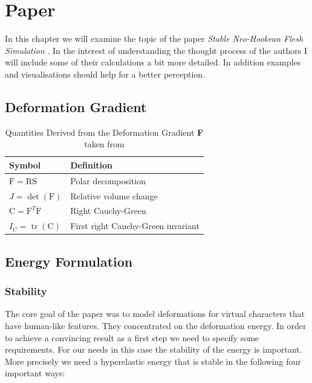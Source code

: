 \chapter{Paper} \label{c:Paper}
In this chapter we will examine the topic of the paper \textit{Stable Neo-Hookean Flesh Simulation} \cite{Smith:2018:SNF:3191713.3180491}. In the interest of understanding the thought process of the authors I will include some of their calculations a bit more detailed. In addition examples and visualisations should help for a better perception. 

\section{Deformation Gradient}

\begin{table}[!htbp]
\centering
    \begin{tabular}{ | l | l |}
    \hline
    \textbf{Symbol} & \textbf{Definition} \\ \hline
    $\mathrm{F=RS}$ & Polar decomposition \\ \hline
    $J=\operatorname{det}(\mathrm{F})$ & Relative volume change \\ \hline
    $\mathrm{C}=\mathrm{F}^{T} \mathrm{F}$ & Right Cauchy-Green  \\ \hline	
    $I_{C}=\operatorname{tr}(\mathrm{C})$ & First right Cauchy-Green invariant \\ \hline
    \end{tabular}
    \caption{Quantities Derived from the Deformation Gradient \textbf{F} taken from \cite{Smith:2018:SNF:3191713.3180491}}
\label{table:1}
\end{table}



\section{Energy Formulation}

\subsection{Stability}
The core goal of the paper was to model deformations for virtual characters that have human-like features. They concentrated on the deformation energy. In order to achieve a convincing result as a first step we need to specify some requirements. For our needs in this case the stability of the energy is important. More precisely we need a hyperelastic energy that is stable in the following four important ways:

